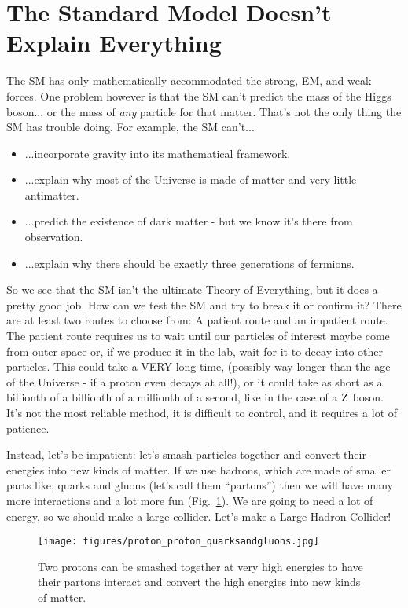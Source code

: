 
\section{The Standard Model Doesn't Explain Everything}
The SM has only mathematically accommodated the strong, EM, and weak forces.
One problem however is that the SM can't predict the mass of the Higgs boson... or the mass of \emph{any} particle for that matter.
That's not the only thing the SM has trouble doing. 
For example, the SM can't...
\begin{itemize}
    \item ...incorporate gravity into its mathematical framework.
    \item ...explain why most of the Universe is made of matter and very little antimatter.
    \item ...predict the existence of dark matter - but we know it's there from observation.
    \item ...explain why there should be exactly three generations of fermions. 
\end{itemize}

So we see that the SM isn't the ultimate Theory of Everything, but it does a pretty good job. 
How can we test the SM and try to break it or confirm it?
There are at least two routes to choose from:
A patient route and an impatient route.
The patient route requires us to wait until our particles of interest
maybe come from outer space or, if we produce it in the lab, 
wait for it to decay into other particles. 
This could take a VERY long time, (possibly way longer than the age of the Universe - if a proton even decays at all!),
or it could take as short as a billionth of a billionth of a millionth of a second, 
like in the case of a ${\rm Z}$ boson.
It's not the most reliable method, it is difficult to control, and it requires a lot of patience.

Instead, let's be impatient: 
let's smash particles together and convert their energies into new kinds of matter. 
If we use hadrons, which are made of smaller parts like, quarks and gluons 
(let's call them ``partons'') then we will have many more interactions and a lot more fun (Fig.~\ref{fig:pp_collision}).
We are going to need a lot of energy, so we should make a large collider. 
Let's make a Large Hadron Collider!
\begin{figure}[pbth]
\centering
\texttt{[image: figures/proton\_proton\_quarksandgluons.jpg]}
    \caption{
    Two protons can be smashed together at very high energies to have their partons interact and convert the high energies into new kinds of matter.} 
    \label{fig:pp_collision}
\end{figure}
